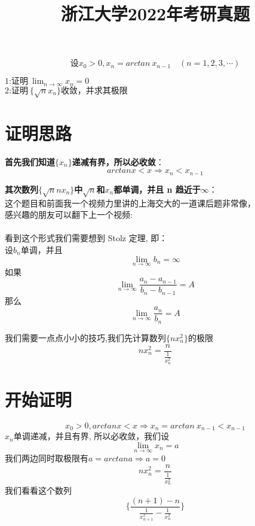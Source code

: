 \documentclass[11pt,a4paper,oneside]{article}
\title{\color{primary} 浙江大学2022年考研真题}
\date{}
\begin{document}

\maketitle
\thispagestyle{fancy}
\huge
\[
\mbox{设} x_0 > 0, x_n = arctan\ x_{n-1} \quad(n = 1,2,3,\cdots)
\]
\begin{flushleft}
    \quad\qquad$\mbox{1:证明}\ \lim_{n\to\infty}x_n = 0$
    \\
    \quad\qquad$\mbox{2:证明}\ \{\sqrt{n}x_n\}\mbox{收敛，并求其极限}$
\end{flushleft}


\newpage
{}
\section{证明思路}
\Large
\textbf{首先我们知道$\{x_n\}$递减有界，所以必收敛}：
\\
\[arctan x < x \Rightarrow x_n < x_{n-1}\]

\textbf{其次数列$\{\sqrt{n}nx_n\}$中$\sqrt{n}$和$x_n$都单调，并且 n 趋近于$\infty$}：\\

\mbox{\boldmath \color{shelegreen}这个题目和前面我一个视频力里讲的上海交大的一道课后题非常像，}\\
\mbox{\color{shelegreen}感兴趣的朋友可以翻下上一个视频:}\\
\\
看到这个形式我们需要想到 Stolz 定理, 即：\\
设${b_n}$单调，并且 \[\lim_{n\to\infty} b_n = \infty\]
\quad 如果\[\lim_{n\to\infty} \frac{a_{n}-a_{n-1}}{b_{n}-b_{n-1}}=A \]
\quad 那么\[\lim_{n\to\infty} \frac{a_{n}}{b_{n}}=A \]

我们需要一点点小小的技巧,我们先计算数列$\{nx_n^2\}$的极限
\[nx_n^2 = \frac{n}{\frac{1}{x_n^2}}\]

\newpage
{}

\section{开始证明}

\[x_0 > 0, arctanx < x \Longrightarrow x_n = arctan\ x_{n-1} < x_{n-1} \]
${x_n}$单调递减，并且有界, 所以必收敛，我们设 \[\lim_{n\to\infty}x_n = a\]
我们两边同时取极限有$a = arctan a \Rightarrow a = 0$\\

\[nx_n^2 = \frac{n}{\frac{1}{x_n^2}}\]我们看看这个数列\[\{\frac{(n+1) - n}{\frac{1}{x_{n+1}^2} - \frac{1}{x_n^2}}\}\]
\end{document}

